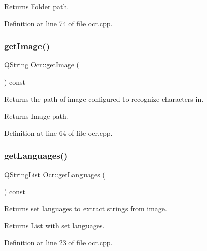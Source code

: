 \begin{DoxyReturn}{Returns}
Folder path. 
\end{DoxyReturn}


Definition at line 74 of file ocr.\+cpp.

\mbox{\label{classOcr_a4bd4275b9b0503dd23dd553b4c0ef54c}} 
\subsubsection{\texorpdfstring{get\+Image()}{getImage()}}
{\footnotesize\ttfamily Q\+String Ocr\+::get\+Image (\begin{DoxyParamCaption}{ }\end{DoxyParamCaption}) const}



Returns the path of image configured to recognize characters in. 

\begin{DoxyReturn}{Returns}
Image path. 
\end{DoxyReturn}


Definition at line 64 of file ocr.\+cpp.

\mbox{\label{classOcr_abf98eb2648c41446700515c3e6ed3a24}} 
\subsubsection{\texorpdfstring{get\+Languages()}{getLanguages()}}
{\footnotesize\ttfamily Q\+String\+List Ocr\+::get\+Languages (\begin{DoxyParamCaption}{ }\end{DoxyParamCaption}) const\hspace{0.3cm}{\ttfamily [virtual]}}



Returns set languages to extract strings from image. 

\begin{DoxyReturn}{Returns}
List with set languages. 
\end{DoxyReturn}


Definition at line 23 of file ocr.\+cpp.

\mbox{\label{classOcr_a0c9ebb9b531bdcd6789d4bf9cffb1d42}} 

